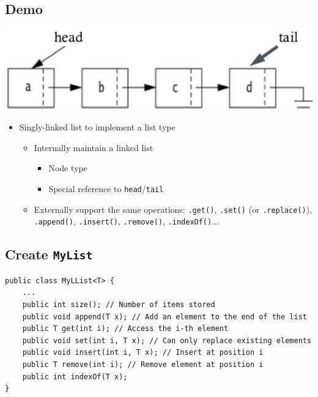 \documentclass[10pt]{article}
\begin{document}
\subsection*{Demo}
\begin{center}
\includegraphics[width=\textwidth/4]{images/4.png}
\end{center}
\begin{itemize}
    \item Singly-linked list to implement a list type
    \begin{itemize}
        \item Internally maintain a linked list
        \begin{itemize}
            \item Node type
            \item Special reference to \texttt{head}/\texttt{tail}
        \end{itemize}
        \item Externally support the same operations: \texttt{.get()}, \texttt{.set()} (or \texttt{.replace()}), \texttt{.append()}, \texttt{.insert()}, \texttt{.remove()}, \texttt{.indexOf()}...
    \end{itemize}
\end{itemize}

\subsection*{Create \texttt{MyList}}
\begin{verbatim}
public class MyLList<T> {
    ...
    public int size(); // Number of items stored
    public void append(T x); // Add an element to the end of the list
    public T get(int i); // Access the i-th element
    public void set(int i, T x); // Can only replace existing elements
    public void insert(int i, T x); // Insert at position i
    public T remove(int i); // Remove element at position i
    public int indexOf(T x);
}
\end{verbatim}
\end{document}
